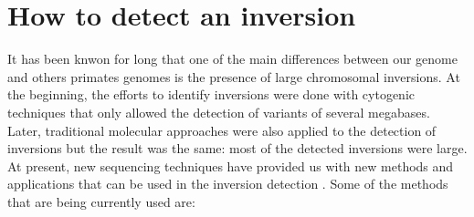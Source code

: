 \documentclass{article}
\begin{document}
\section{How to detect an inversion}
It has been knwon for long that one of the main differences between our genome and others primates genomes is the presence of large chromosomal inversions. At the beginning, the efforts to identify inversions were done with cytogenic techniques that only allowed the detection of variants of several megabases. Later, traditional molecular approaches were also applied to the detection of inversions but the result was the same: most of the detected inversions were large. At present, new sequencing techniques have provided us with new methods and applications that can be used in the inversion detection \cite{puig_human_2015}. 
Some of the methods that are being currently used are:
\end{document}

